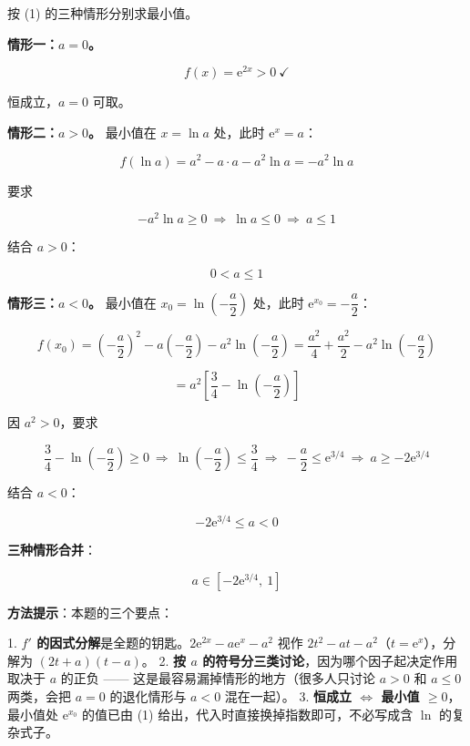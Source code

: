 按 (1) 的三种情形分别求最小值。

\textbf{情形一：$a=0$。}

\[f(x)=\mathrm e^{2x}>0\ \checkmark\]

恒成立，$a=0$ 可取。

\textbf{情形二：$a>0$。} 最小值在 $x=\ln a$ 处，此时 $\mathrm e^{x}=a$：

\[f(\ln a)=a^{2}-a\cdot a-a^{2}\ln a=-a^{2}\ln a\]

要求

\[-a^{2}\ln a\ge0\ \Longrightarrow\ \ln a\le0\ \Longrightarrow\ a\le1\]

结合 $a>0$：

\[0<a\le1\]

\textbf{情形三：$a<0$。} 最小值在 $x_0=\ln\left(-\dfrac a2\right)$ 处，此时 $\mathrm e^{x_0}=-\dfrac a2$：

\[f\left(x_0\right)=\left(-\frac a2\right)^{2}-a\left(-\frac a2\right)-a^{2}\ln\left(-\frac a2\right)=\frac{a^{2}}4+\frac{a^{2}}2-a^{2}\ln\left(-\frac a2\right)\]

\[=a^{2}\left[\frac34-\ln\left(-\frac a2\right)\right]\]

因 $a^{2}>0$，要求

\[\frac34-\ln\left(-\frac a2\right)\ge0\ \Longrightarrow\ \ln\left(-\frac a2\right)\le\frac34\ \Longrightarrow\ -\frac a2\le\mathrm e^{3/4}\ \Longrightarrow\ a\ge-2\mathrm e^{3/4}\]

结合 $a<0$：

\[-2\mathrm e^{3/4}\le a<0\]

\textbf{三种情形合并}：

\[a\in\left[-2\mathrm e^{3/4},\ 1\right]\]


\begin{gktip}
\textbf{方法提示}：本题的三个要点：

1. \textbf{$f'$ 的因式分解}是全题的钥匙。$2\mathrm e^{2x}-a\mathrm e^{x}-a^{2}$ 视作 $2t^{2}-at-a^{2}$（$t=\mathrm e^{x}$），分解为 $(2t+a)(t-a)$。
2. \textbf{按 $a$ 的符号分三类讨论}，因为哪个因子起决定作用取决于 $a$ 的正负 —— 这是最容易漏掉情形的地方（很多人只讨论 $a>0$ 和 $a\le0$ 两类，会把 $a=0$ 的退化情形与 $a<0$ 混在一起）。
3. \textbf{恒成立 $\iff$ 最小值 $\ge0$}，最小值处 $\mathrm e^{x_0}$ 的值已由 (1) 给出，代入时直接换掉指数即可，不必写成含 $\ln$ 的复杂式子。
\end{gktip}

\par\medskip

